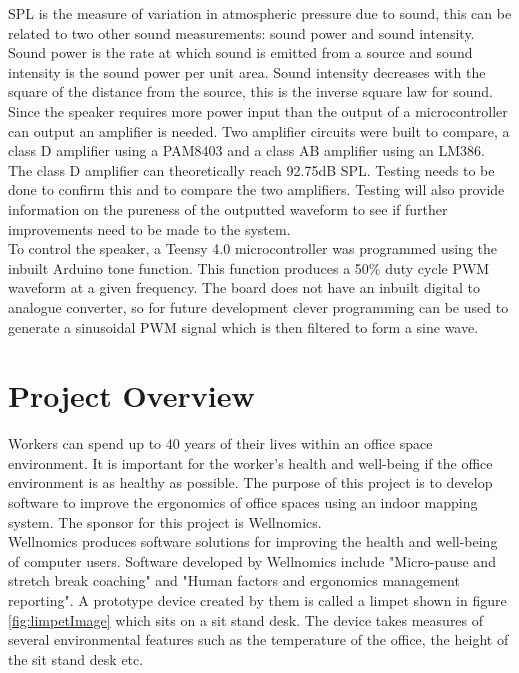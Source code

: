 \documentclass[12pt, a4paper]{article}
\begin{document}
SPL is the measure of variation in atmospheric pressure due to sound, this can be related to two other sound measurements: sound power and sound intensity. Sound power is the rate at which sound is emitted from a source and sound intensity is the sound power per unit area. Sound intensity decreases with the square of the distance from the source, this is the inverse square law for sound. \\

Since the speaker requires more power input than the output of a microcontroller can output an amplifier is needed. Two amplifier circuits were built to compare, a class D amplifier using a PAM8403 and a class AB amplifier using an LM386. The class D amplifier can theoretically reach 92.75dB SPL. Testing needs to be done to confirm this and to compare the two amplifiers. Testing will also provide information on the pureness of the outputted waveform to see if further improvements need to be made to the system. \\

To control the speaker, a Teensy 4.0 microcontroller was programmed using the inbuilt Arduino tone function. This function produces a 50\% duty cycle PWM waveform at a given frequency. The board does not have an inbuilt digital to analogue converter, so for future development clever programming can be used to generate a sinusoidal PWM signal which is then filtered to form a sine wave. \\

\pagebreak
\tableofcontents
\pagebreak
\section{Project Overview}
Workers can spend up to 40 years of their lives within an office space environment. It is important for the worker's health and well-being if the office environment is as healthy as possible. The purpose of this project is to develop software to improve the ergonomics of office spaces using an indoor mapping system. The sponsor for this project is Wellnomics. \\

Wellnomics produces software solutions for improving the health and well-being of computer users. Software developed by Wellnomics include "Micro-pause and stretch break coaching" and "Human factors and ergonomics management reporting". A prototype device created by them is called a limpet shown in figure \ref{fig:limpetImage} which sits on a sit stand desk. The device takes measures of several environmental features such as the temperature of the office, the height of the sit stand desk etc. \\
\end{document}
